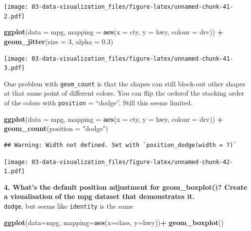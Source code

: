\documentclass[]{book}
\newenvironment{Shaded}{\begin{snugshade}}{\end{snugshade}}
\newcommand{\DataTypeTok}[1]{\textcolor[rgb]{0.13,0.29,0.53}{#1}}
\newcommand{\DecValTok}[1]{\textcolor[rgb]{0.00,0.00,0.81}{#1}}
\newcommand{\FloatTok}[1]{\textcolor[rgb]{0.00,0.00,0.81}{#1}}
\newcommand{\KeywordTok}[1]{\textcolor[rgb]{0.13,0.29,0.53}{\textbf{#1}}}
\newcommand{\NormalTok}[1]{#1}
\newcommand{\OperatorTok}[1]{\textcolor[rgb]{0.81,0.36,0.00}{\textbf{#1}}}
\newcommand{\StringTok}[1]{\textcolor[rgb]{0.31,0.60,0.02}{#1}}
\theoremstyle{definition}
\theoremstyle{definition}
\theoremstyle{definition}
\theoremstyle{remark}
\begin{document}
\texttt{[image: 03-data-visualization\_files/figure-latex/unnamed-chunk-41-2.pdf]}

\begin{Shaded}
\begin{Highlighting}[]
\KeywordTok{ggplot}\NormalTok{(}\DataTypeTok{data =}\NormalTok{ mpg, }\DataTypeTok{mapping =} \KeywordTok{aes}\NormalTok{(}\DataTypeTok{x =}\NormalTok{ cty, }\DataTypeTok{y =}\NormalTok{ hwy, }\DataTypeTok{colour =}\NormalTok{ drv)) }\OperatorTok{+}\StringTok{ }
\StringTok{  }\KeywordTok{geom_jitter}\NormalTok{(}\DataTypeTok{size =} \DecValTok{3}\NormalTok{, }\DataTypeTok{alpha =} \FloatTok{0.3}\NormalTok{)}
\end{Highlighting}
\end{Shaded}

\texttt{[image: 03-data-visualization\_files/figure-latex/unnamed-chunk-41-3.pdf]}

One problem with \texttt{geom\_count} is that the shapes can still
block-out other shapes at that same point of different colors. You can
flip the orderof the stacking order of the colors with \texttt{position}
= ``dodge''. Still this seems limited.

\begin{Shaded}
\begin{Highlighting}[]
\KeywordTok{ggplot}\NormalTok{(}\DataTypeTok{data =}\NormalTok{ mpg, }\DataTypeTok{mapping =} \KeywordTok{aes}\NormalTok{(}\DataTypeTok{x =}\NormalTok{ cty, }\DataTypeTok{y =}\NormalTok{ hwy, }\DataTypeTok{colour =}\NormalTok{ drv)) }\OperatorTok{+}\StringTok{ }
\StringTok{  }\KeywordTok{geom_count}\NormalTok{(}\DataTypeTok{position =} \StringTok{"dodge"}\NormalTok{)}
\end{Highlighting}
\end{Shaded}

\begin{verbatim}
## Warning: Width not defined. Set with `position_dodge(width = ?)`
\end{verbatim}

\texttt{[image: 03-data-visualization\_files/figure-latex/unnamed-chunk-42-1.pdf]}

\textbf{4. What's the default position adjustment for geom\_boxplot()?
Create a visualisation of the mpg dataset that demonstrates it.}\\
\texttt{dodge}, but seems like \texttt{identity} is the same

\begin{Shaded}
\begin{Highlighting}[]
\KeywordTok{ggplot}\NormalTok{(}\DataTypeTok{data=}\NormalTok{mpg, }\DataTypeTok{mapping=}\KeywordTok{aes}\NormalTok{(}\DataTypeTok{x=}\NormalTok{class, }\DataTypeTok{y=}\NormalTok{hwy))}\OperatorTok{+}
\StringTok{  }\KeywordTok{geom_boxplot}\NormalTok{()}
\end{Highlighting}
\end{Shaded}
\end{document}
